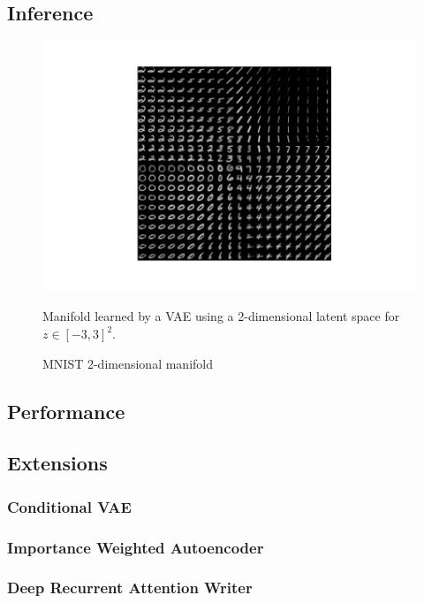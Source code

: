 \subsection{Inference}
\label{sub:vae_inference}
\begin{figure}[htb]
\centering
\includegraphics{media/manifold.pdf}
  \caption{MNIST 2-dimensional manifold}\label{fig:vae_manifold}
  \medskip
  \small
  Manifold learned by a VAE using a 2-dimensional latent space for $z \in [-3,3]^2$.
\end{figure}

\subsection{Performance}
\label{sub:vae_performance}

\subsection{Extensions}
\label{sub:vae_extensions}

\subsubsection{Conditional VAE \cite{cvae:2015}}
\label{ssub:vae_conditional_vae}


\subsubsection{Importance Weighted Autoencoder \cite{iwae:2015}}
\label{ssub:vae_importance_weighted_autoencoder}


\subsubsection{Deep Recurrent Attention Writer \cite{draw:2015}}
\label{ssub:vae_deep_recurrent_attention_writer}


